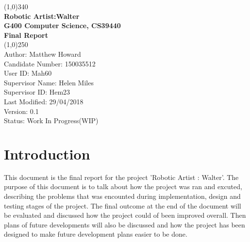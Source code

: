 \documentclass{article}
\begin{document}

    \begin{titlepage}

        \begin{center}

        \line(1,0){340}\\ 


        \large{\bfseries Robotic Artist:Walter} \\

        \large {\bfseries G400 Computer Science, CS39440 }\\
        
        \large {\bfseries Final Report}\\


         \line(1,0){250}\\

         \textsf {Author: Matthew Howard \\
          Candidate Number: 150035512\\
          User ID: Mah60 \\
          Supervisor Name: Helen Miles \\
          Supervisor ID: Hem23\\
          Last Modified: 29/04/2018 \\
          Version: 0.1\\
          Status: Work In Progress(WIP)} \\

        \end{center}        

    \end{titlepage}
  
    \clearpage

 	\tableofcontents
 	
 	\clearpage
    \section{Introduction}
    
This document is the final report for the project 'Robotic Artist : Walter'. The purpose of this document is to talk about how the project was ran and excuted, describing the problems that was encounted during implementation, design and testing stages of the project. The final outcome at the end of the document will be evaluated and discussed how the project could of been improved overall. Then plans of future developments will also be discussed and how the project has been designed to make future development plans easier to be done.\\ \newline
 
\end{document}
